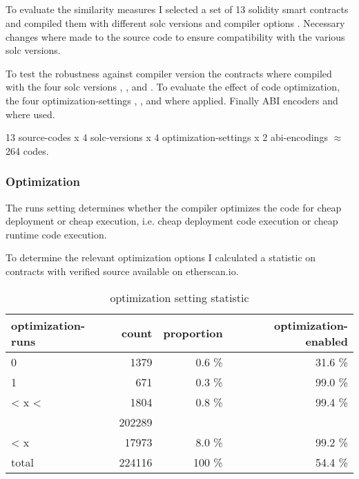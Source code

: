 \documentclass[../main.tex]{subfiles}
\begin{document}
\subsection{ \label{sec:solcts}}
To evaluate the similarity measures I selected a set of 13 solidity smart contracts and compiled
them with different solc versions and compiler options \cite{solc-versions-testset}.
Necessary changes where made to the source code to ensure compatibility with the various solc
versions.

To test the robustness against compiler version the contracts where compiled with the four solc versions , ,  and .
To evaluate the effect of code optimization, the four optimization-settings , ,  and  where applied.
Finally ABI encoders  and  where used.

13 source-codes x 4 solc-versions x 4 optimization-settings x 2 abi-encodings $\approx$ 264 codes.

\subsubsection{Optimization}
The runs setting determines whether the compiler optimizes the code for cheap deployment or cheap execution, i.e. cheap deployment code execution or cheap runtime code execution.

To determine the relevant optimization options I calculated a statistic  on contracts with verified source available on etherscan.io.

\begin{table*}[ht]
  \centering
  \scriptsize
  \begin{tabular}{lrrr}
    optimization-runs & count  & proportion           & optimization-enabled \\
    \hline
    0                 & 1379   & 0.6 \%               & 31.6 \%              \\
    1                 & 671    & 0.3 \%               & 99.0 \%              \\
    < x <             & 1804   & 0.8 \%               & 99.4 \%              \\
    \color{red}{200}  & 202289 & \color{red}{90.3 \%} & \color{red}{50.0 \%} \\
    < x               & 17973  & 8.0 \%               & 99.2 \%              \\
    \hline
    total             & 224116 & 100 \%               & 54.4 \%
  \end{tabular}
  \caption{optimization setting statistic}
  \label{tbl:opti_stat}
\end{table*}
\end{document}
